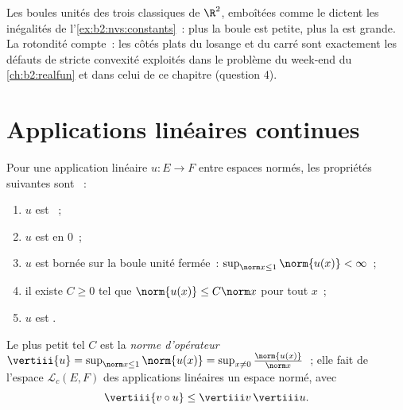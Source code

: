 \begin{omfigure}

{\small Les boules unités des trois  classiques de $\R^2$,
emboîtées comme le dictent les inégalités de l'\cref{ex:b2:nvs:constants}~:
plus la boule est petite, plus la  est grande. La rotondité
compte~: les côtés plats du losange et du carré sont exactement les
défauts de stricte convexité exploités dans le problème du week-end du
\cref{ch:b2:realfun} et dans celui de ce chapitre (question 4).}
\end{omfigure}

\section{Applications linéaires continues}

\begin{theorem}[Caractérisation]\label{thm:b2:nvs:continuouslinear}
Pour une application linéaire $u \colon E \to F$ entre espaces normés,
les propriétés suivantes sont ~:
\begin{enumerate}
  \item $u$ est ~;
  \item $u$ est  en $0$~;
  \item $u$ est bornée sur la boule unité fermée~: $\sup_{\norm x \leq
        1} \norm{u(x)} < \infty$~;
  \item il existe $C \geq 0$ tel que $\norm{u(x)} \leq C \norm x$ pour
        tout $x$~;
  \item $u$ est .
\end{enumerate}
Le plus petit tel $C$ est la \emph{norme d'opérateur}
$\vertiii{u} = \sup_{\norm x \leq 1}\norm{u(x)} = \sup_{x \neq 0}
\frac{\norm{u(x)}}{\norm x}$~; elle fait de l'espace $\mathcal{L}_c(E,
F)$ des applications linéaires  un espace normé, avec
\[
\vertiii{v \circ u} \leq \vertiii v\, \vertiii u .
\]
\end{theorem}

